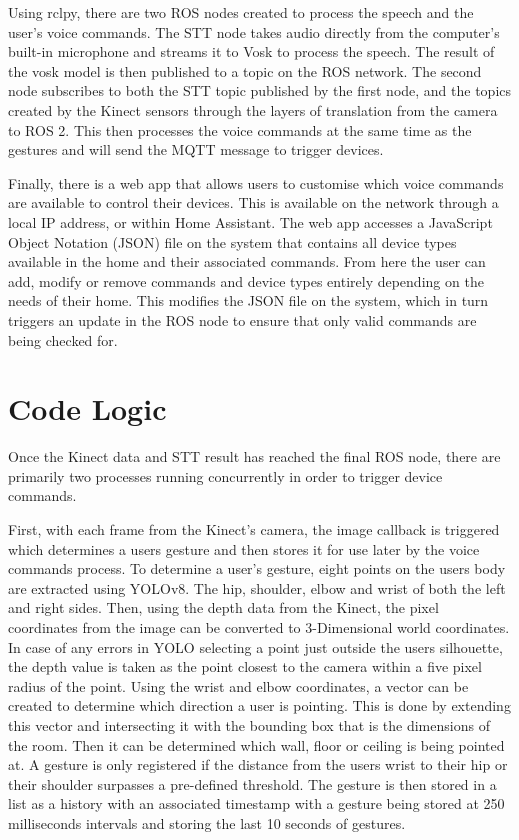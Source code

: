 Using rclpy, there are two ROS nodes created to process the speech and the user's voice commands.
The STT node takes audio directly from the computer's built-in microphone and streams it to Vosk to process the speech.
The result of the vosk model is then published to a topic on the ROS network.
The second node subscribes to both the STT topic published by the first node, and the topics created by the Kinect sensors through the layers of translation from the camera to ROS 2.
This then processes the voice commands at the same time as the gestures and will send the MQTT message to trigger devices.

Finally, there is a web app that allows users to customise which voice commands are available to control their devices.
This is available on the network through a local IP address, or within Home Assistant.
The web app accesses a JavaScript Object Notation (JSON) file on the system that contains all device types available in the home and their associated commands.
From here the user can add, modify or remove commands and device types entirely depending on the needs of their home.
This modifies the JSON file on the system, which in turn triggers an update in the ROS node to ensure that only valid commands are being checked for.

\section{Code Logic}

Once the Kinect data and STT result has reached the final ROS node, there are primarily two processes running concurrently in order to trigger device commands.

First, with each frame from the Kinect's camera, the image callback is triggered which determines a users gesture and then stores it for use later by the voice commands process.
To determine a user's gesture, eight points on the users body are extracted using YOLOv8.
The hip, shoulder, elbow and wrist of both the left and right sides.
Then, using the depth data from the Kinect, the pixel coordinates from the image can be converted to 3-Dimensional world coordinates.
In case of any errors in YOLO selecting a point just outside the users silhouette, the depth value is taken as the point closest to the camera within a five pixel radius of the point.
Using the wrist and elbow coordinates, a vector can be created to determine which direction a user is pointing.
This is done by extending this vector and intersecting it with the bounding box that is the dimensions of the room.
Then it can be determined which wall, floor or ceiling is being pointed at.
A gesture is only registered if the distance from the users wrist to their hip or their shoulder surpasses a pre-defined threshold.
The gesture is then stored in a list as a history with an associated timestamp with a gesture being stored at 250 milliseconds intervals and storing the last 10 seconds of gestures.

